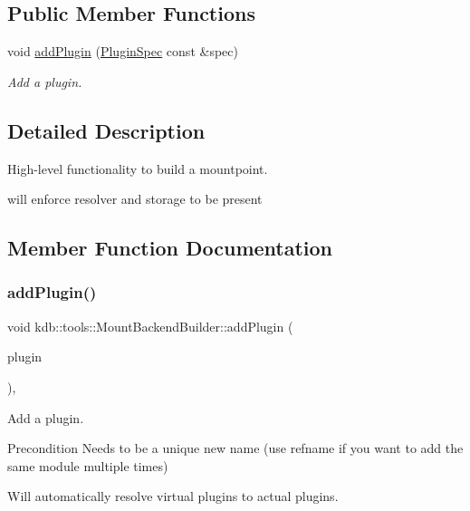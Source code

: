 \subsection*{Public Member Functions}
\begin{DoxyCompactItemize}
\item 
void \hyperlink{classkdb_1_1tools_1_1MountBackendBuilder_a2603e75436a49fc66696c1b41b27efb9}{add\+Plugin} (\hyperlink{classkdb_1_1tools_1_1PluginSpec}{Plugin\+Spec} const \&spec)
\begin{DoxyCompactList}\small\item\em Add a plugin. \end{DoxyCompactList}\end{DoxyCompactItemize}


\subsection{Detailed Description}
High-\/level functionality to build a mountpoint. 

will enforce resolver and storage to be present 

\subsection{Member Function Documentation}
\mbox{\label{classkdb_1_1tools_1_1MountBackendBuilder_a2603e75436a49fc66696c1b41b27efb9}} 
\subsubsection{\texorpdfstring{add\+Plugin()}{addPlugin()}}
{\footnotesize\ttfamily void kdb\+::tools\+::\+Mount\+Backend\+Builder\+::add\+Plugin (\begin{DoxyParamCaption}\item[{\hyperlink{classkdb_1_1tools_1_1PluginSpec}{Plugin\+Spec} const \&}]{plugin }\end{DoxyParamCaption})\hspace{0.3cm}{\ttfamily [inline]}, {\ttfamily [virtual]}}



Add a plugin. 

\begin{DoxyPrecond}{Precondition}
Needs to be a unique new name (use refname if you want to add the same module multiple times)
\end{DoxyPrecond}
Will automatically resolve virtual plugins to actual plugins.

